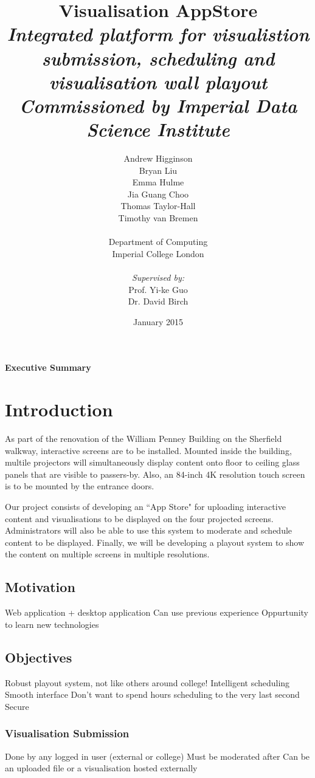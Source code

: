 ﻿\documentclass[a4paper, titlepage]{article}
\title{Visualisation AppStore \\ \vspace{10pt}
\textit{\large Integrated platform for visualistion submission, scheduling and visualisation wall playout} \\ \vspace*{-5pt}
\textit{\large Commissioned by Imperial Data Science Institute}}
\author{Andrew Higginson\\ Bryan Liu \\ Emma Hulme \\ Jia Guang Choo \\
        Thomas Taylor-Hall \\ Timothy van Bremen \\\\ 
        Department of Computing \\ Imperial College London \\\\ \textit{Supervised by:} \\
        Prof. Yi-ke Guo \\ Dr. David Birch}
\date{January 2015}
\begin{document}
\maketitle


\newpage
{}
\Large
\textbf{Executive Summary}

\normalsize





\newpage
\tableofcontents
\listoffigures
\listoftables


\newpage
{}
\section{Introduction}
As part of the renovation of the William Penney Building on the Sherfield walkway, interactive screens are to be installed.
Mounted inside the building, multile projectors will simultaneously display content onto floor to ceiling glass
panels that are visible to passers-by. Also, an 84-inch 4K resolution touch screen is to be mounted by the entrance doors. 

Our project consists of developing an ``App Store" for uploading interactive content and visualisations to be displayed on the four projected screens.
Administrators will also be able to use this system to moderate and schedule content to be displayed. Finally, we will be developing a playout system 
to show the content on multiple screens in multiple resolutions.


\subsection{Motivation}
Web application + desktop application
Can use previous experience
Oppurtunity to learn new technologies


\subsection{Objectives}
Robust playout system, not like others around college!
Intelligent scheduling
Smooth interface
Don't want to spend hours scheduling to the very last second
Secure


\subsubsection{Visualisation Submission}
Done by any logged in user (external or college)
Must be moderated after
Can be an uploaded file or a visualisation hosted externally
\end{document}
